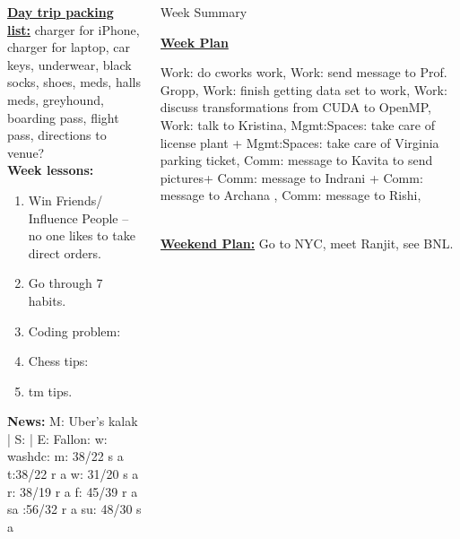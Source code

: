 \begin{columns}
\begin{column}{0.25\linewidth}
      \begin{block}
      
      {\underline{\bf Day trip packing list:} charger for iPhone,
        charger for laptop, car keys, underwear, black socks, shoes,
        meds, halls meds, greyhound, boarding pass, flight pass, directions to
        venue?} \\ 
      {\tiny {\bf Week lessons:}} \\ 
      \begin{enumerate}
        \tiny \item \tiny Win Friends/ Influence People – no one
        likes to take direct orders.
      \item \tiny Go through 7 habits.
      \item \tiny Coding problem: 
      \item \tiny Chess tips: 
      \item \tiny tm tips.
      \end{enumerate}
          {{\tiny {\bf News:}} M: Uber's kalak  | S:    | E: Fallon: 
            w: washdc: 
            {m: {38/22 s a}}  
            {t:{38/22 r a}} 
            {w: {31/20 s a}} 
            {r: {38/19 r a}} 
            {f: {45/39 r a}} 
            {sa :{56/32 r a} }
            {su: {48/30 s a}}} 
    \end{block}
    
  \end{column}     
 
  \begin{column}{0.5\linewidth}
    \begin{block}{Week Summary} 
      {\underline{\bf Week Plan} 

        Work: do cworks work, Work: send message to Prof. Gropp, Work: finish getting data set to work,
        Work: discuss transformations from CUDA to OpenMP, Work: talk
        to Kristina, Mgmt:Spaces: take care of license plant +
        Mgmt:Spaces: take care of Virginia parking ticket, Comm:
        message to Kavita to send pictures+ Comm: message to Indrani +
        Comm: message to Archana , Comm: message to Rishi,

 }\\ 

      {\underline{\bf Weekend Plan:} Go to NYC, meet Ranjit, see BNL.}\\

    \end{block}



\end{column}
\end{columns}
